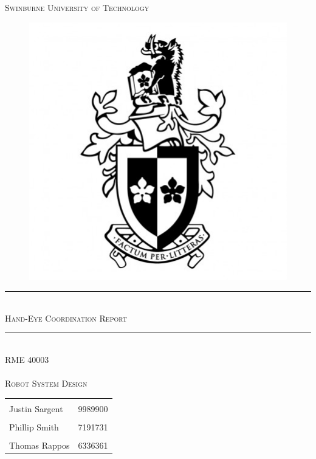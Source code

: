 \documentclass[11pt,a4paper]{report}
\begin{document}
\begin{titlepage}
	\begin{center}
		\vspace*{-.5cm}
		\textsc{\LARGE Swinburne University of Technology}\\
		
		\begin{figure}[h]
			\centering
			\includegraphics[width=0.5\linewidth]{swinburne_university_of_technology_111401}
		\end{figure}
		\vspace*{2cm}
		\hrule \  \\[0.4cm]
		\textsc{\Huge Hand-Eye Coordination Report}\\[0.5cm]
		\hrule \  \\[0.4cm]
		\textsc{\Large{RME 40003}\\ \  \\[0.1cm]
			\huge Robot System Design}\\[1cm]
		
		\normalsize
		\begin{tabular}{l r}
			\hline\\ Justin Sargent & 9989900 \\[0.25cm]
			\\ Phillip Smith & 7191731 \\ [0.25cm]
			\\ Thomas Rappos & 6336361 \\[0.25cm]
			\hline 
		\end{tabular} 
	\end{center}
\end{titlepage}
\tableofcontents
\end{document}
